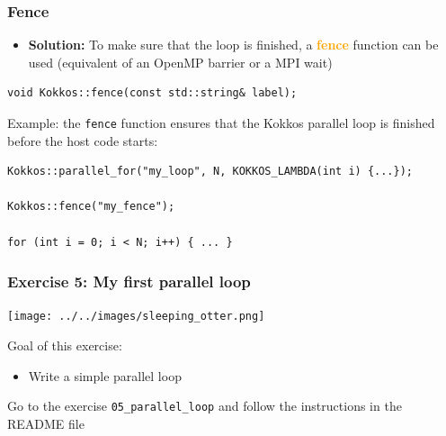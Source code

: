 \documentclass[aspectratio=169]{beamer}
\newcommand{\highlight}[1]{\textcolor{orange}{\textbf{#1}}}
\begin{document}

\begin{frame}[fragile]
    \frametitle{Fence} 

\begin{itemize}
    \item \textbf{Solution:} To make sure that the loop is finished, a \highlight{fence} function can be used (equivalent of an OpenMP barrier or a MPI wait)
\end{itemize}

\begin{verbatim}
void Kokkos::fence(const std::string& label);
\end{verbatim}

Example: the \texttt{fence} function ensures that the Kokkos parallel loop is finished before the host code starts:

\small
\begin{verbatim}
Kokkos::parallel_for("my_loop", N, KOKKOS_LAMBDA(int i) {...});

Kokkos::fence("my_fence");

for (int i = 0; i < N; i++) { ... }
\end{verbatim}

\end{frame}


\begin{frame}[fragile]
    \frametitle{Exercise 5: My first parallel loop} 

    \begin{center}
    \texttt{[image: ../../images/sleeping\_otter.png]}
    \end{center}

    Goal of this exercise:

    \begin{itemize}
        \item Write a simple parallel loop
    \end{itemize}

    \begin{block}{}
        Go to the exercise \texttt{05\_parallel\_loop} and follow the instructions in the README file
    \end{block}

\end{frame}

\end{document}
